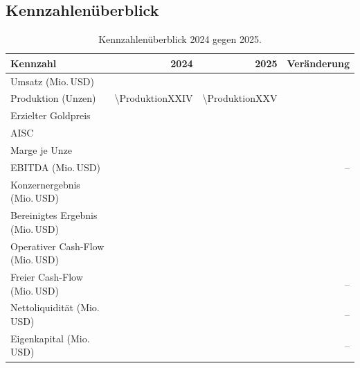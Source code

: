 \subsection*{Kennzahlen\"uberblick}

\begin{table}[htbp]
\centering
\caption{Kennzahlen\"uberblick 2024 gegen 2025.}
\label{tab:ueberblick}
\begin{tabular}{lrrr}
\toprule
Kennzahl & 2024 & 2025 & Ver\"anderung\\
\midrule
Umsatz (Mio.\,USD) & \MioUSDexakt{\UmsatzVJ} & \MioUSDexakt{\Umsatz} & \Pct{\UmsatzDelta}\\
Produktion (Unzen) & \num{\ProduktionXXIV} & \num{\ProduktionXXV} & \Pct{\ProduktionDelta}\\
Erzielter Goldpreis & \JeUnze{\GoldpreisVJ} & \JeUnze{\Goldpreis} & \Pct{\GoldpreisDelta}\\
AISC & \JeUnze{\AISCVJneu} & \JeUnze{\AISCXXV} & \Pct{\AISCDelta}\\
Marge je Unze & \JeUnze{\MargeJeUnzeVJ} & \JeUnze{\MargeJeUnze} & \Pct{\MargeJeUnzeDelta}\\
EBITDA (Mio.\,USD) & \MioUSDexakt{\EBITDAVJ} & \MioUSDexakt{\EBITDA} & --\\
Konzernergebnis (Mio.\,USD) & \MioUSDexakt{\KonzernergebnisVJ} & \MioUSDexakt{\Konzernergebnis} & \Pct{\ErgebnisDelta}\\
Bereinigtes Ergebnis (Mio.\,USD) & \MioUSDexakt{\BereinigtesErgebnisVJ} & \MioUSDexakt{\BereinigtesErgebnis} & \Pct{\BereinigtDelta}\\
Operativer Cash-Flow (Mio.\,USD) & \MioUSDexakt{\OpCashflowVJ} & \MioUSDexakt{\OpCashflow} & \Pct{\OpCashflowDelta}\\
Freier Cash-Flow (Mio.\,USD) & \MioUSDexakt{\FCFReiheXXIV} & \MioUSDexakt{\FCFReiheXXV} & --\\
Nettoliquidit\"at (Mio.\,USD) & \MioUSDexakt{\NettoliquiditaetVJ} & \MioUSDexakt{\Nettoliquiditaet} & --\\
Eigenkapital (Mio.\,USD) & \MioUSDexakt{\EigenkapitalVJ} & \MioUSDexakt{\Eigenkapital} & --\\
\bottomrule
\end{tabular}
\end{table}
